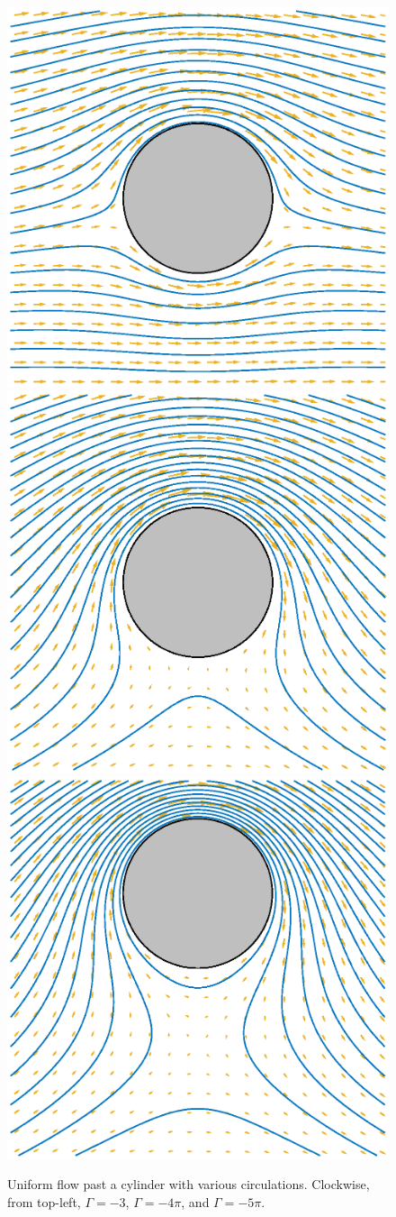 \documentclass[12pt,fleqn]{article}
\begin{document}
\begin{figure}[htbp]
  \centering
  \includegraphics[width=.46\textwidth]{figures/onecirculate}
  \hspace{.02\textwidth}
  \includegraphics[width=.46\textwidth]{figures/circlebottom}
  \\\vspace*{.02\textwidth}
  \includegraphics[width=.46\textwidth]{figures/offcircle}
  \caption{Uniform flow past a cylinder with various circulations. Clockwise, from top-left, $\Gamma=-3$, $\Gamma=-4\pi$, and $\Gamma=-5\pi$.}
  \label{fig:onecirculate}
\end{figure}

\clearpage
\end{document}
